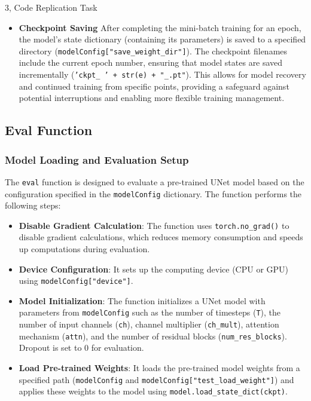 \documentclass[10pt,a4paper]{article}
\begin{document}
\begin{task}{3, Code Replication Task}
\begin{itemize}
\item \textbf{Checkpoint Saving}
After completing the mini-batch training for an epoch, the model's state dictionary (containing its parameters) is saved to a specified directory (\texttt{modelConfig["save\_weight\_dir"]}). The checkpoint filenames include the current epoch number, ensuring that model states are saved incrementally (\texttt{'ckpt\_\ ' + str(e) + "\_.pt"}). This allows for model recovery and continued training from specific points, providing a safeguard against potential interruptions and enabling more flexible training management.
\end{itemize}
   

\subsection{Eval Function}

\subsubsection{Model Loading and Evaluation Setup}
The \texttt{eval} function is designed to evaluate a pre-trained UNet model based on the configuration specified in the \texttt{modelConfig} dictionary. The function performs the following steps:

\begin{itemize}
    \item \textbf{Disable Gradient Calculation}: The function uses \texttt{torch.no\_grad()} to disable gradient calculations, which reduces memory consumption and speeds up computations during evaluation.
    
    \item \textbf{Device Configuration}: It sets up the computing device (CPU or GPU) using \texttt{modelConfig["device"]}.
    
    \item \textbf{Model Initialization}: The function initializes a UNet model with parameters from \texttt{modelConfig} such as the number of timesteps (\texttt{T}), the number of input channels (\texttt{ch}), channel multiplier (\texttt{ch\_mult}), attention mechanism (\texttt{attn}), and the number of residual blocks (\texttt{num\_res\_blocks}). Dropout is set to 0 for evaluation.
    
    \item \textbf{Load Pre-trained Weights}: It loads the pre-trained model weights from a specified path (\texttt{modelConfig} and \texttt{modelConfig["test\_load\_weight"]}) and applies these weights to the model using \texttt{model.load\_state\_dict(ckpt)}.
    

\end{itemize}
\end{task}
\end{document}
